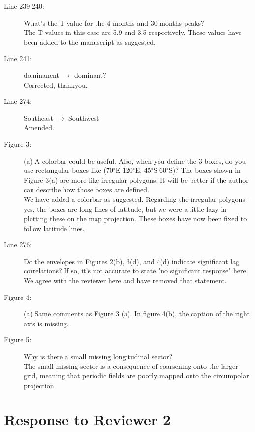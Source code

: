 \documentclass[11pt]{article}
\begin{document}
{\begin{description}
\item[Line 239-240:] What's the T value for the 4 months and 30 months peaks? \\
{\color{black} The T-values in this case are 5.9 and 3.5 respectively. 
These values have been added to the manuscript as suggested.  }

\item[Line 241:] dominanent $\to$ dominant?\\
{\color{black} Corrected, thankyou. }

\item[Line 274:] Southeast $\to$ Southwest\\
{\color{black} Amended. }

\item[Figure 3:] (a) A colorbar could be useful. Also, when you define the 3 boxes, do you use rectangular boxes like (70$^\circ$E-120$^\circ$E, 45$^\circ$S-60$^\circ$S)? The boxes shown in Figure 3(a) are more like irregular polygons. It will be better if the author can describe how those boxes are defined. \\
{\color{black}  We have added a colorbar as suggested. Regarding the irregular polygons -- yes, the boxes are long lines of latitude, but we were a little lazy in plotting these on the map projection. These boxes have now been fixed to follow latitude lines. }

\item[Line 276:] Do the envelopes in Figures 2(b), 3(d), and 4(d) indicate significant lag correlations? If so, it's not accurate to state "no significant response" here.\\
{\color{black} We agree with the reviewer here and have removed that statement. }

\item[Figure 4:] (a) Same comments as Figure 3 (a). In figure 4(b), the caption of the right axis is missing. \\
{\color{black}  }

\item[Figure 5:] Why is there a small missing longitudinal sector?\\
{\color{black} The small missing sector is a consequence of coarsening onto the larger grid, meaning that periodic fields are poorly mapped onto the circumpolar projection. }

\end{description}
}

\newpage

\section*{Response to Reviewer 2}
\end{document}
